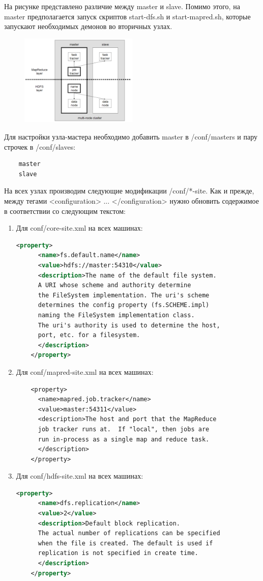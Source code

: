 \documentclass[12pt,a4paper]{extarticle} %
\begin{document}
\noindent На рисунке представлено различие между master и slave. Помимо этого, на master предполагается запуск скриптов start-dfs.sh и start-mapred.sh, которые запускают необходимых демонов во вторичных узлах.
\begin{figure}[h]
 \centering
    \includegraphics[width=0.5\textwidth]{images/two-node-cluster.png}
\end{figure}

\newpage
\noindent Для настройки узла-мастера необходимо добавить master в /conf/masters и пару строчек в /conf/slaves:
\begin{lstlisting}
    master
    slave
\end{lstlisting}

\noindent На всех узлах производим следующие модификации /conf/*-site. Как и прежде, между тегами <configuration> ... </configuration> нужно обновить содержимое в соответствии со следующим текстом:
\begin{enumerate}
    \item  Для conf/core-site.xml  на всех машинах:
\begin{lstlisting}[language=xml]
    <property>
      <name>fs.default.name</name>
      <value>hdfs://master:54310</value>
      <description>The name of the default file system.
      A URI whose scheme and authority determine 
      the FileSystem implementation. The uri's scheme 
      determines the config property (fs.SCHEME.impl) 
      naming the FileSystem implementation class. 
      The uri's authority is used to determine the host,
      port, etc. for a filesystem.
      </description>
    </property>
\end{lstlisting}
    \item Для conf/mapred-site.xml на всех машинах:
\begin{lstlisting}
    <property>
      <name>mapred.job.tracker</name>
      <value>master:54311</value>
      <description>The host and port that the MapReduce
      job tracker runs at.  If "local", then jobs are
      run in-process as a single map and reduce task.
      </description>
    </property>
\end{lstlisting}
    \item Для conf/hdfs-site.xml  на всех машинах:
\begin{lstlisting}[language=xml]
    <property>
      <name>dfs.replication</name>
      <value>2</value>
      <description>Default block replication.
      The actual number of replications can be specified 
      when the file is created. The default is used if 
      replication is not specified in create time.
      </description>
    </property>
\end{lstlisting}
\end{enumerate}
\end{document}
